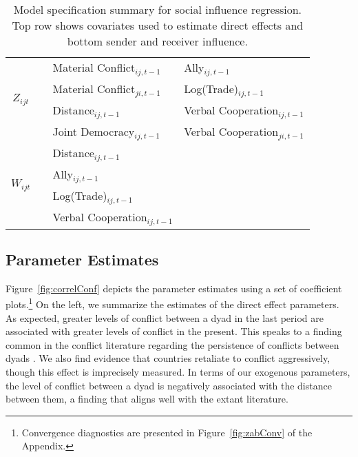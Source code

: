 \begin{table}[ht]
\centering
	\begin{tabular}{ccll}
		\hline\hline
		\multirow{4}{*}{\Large{$Z_{ijt}$}} &
		\multirow{4}{*}{\resizebox{.1\textwidth}{!}{}}
		&
		Material Conflict$_{ij,t-1}$ & Ally$_{ij,t-1}$ \\
		~ & ~ & Material Conflict$_{ji,t-1}$ & Log(Trade)$_{ij,t-1}$ \\
		~ & ~ & Distance$_{ij,t-1}$ & Verbal Cooperation$_{ij,t-1}$ \\
		~ & ~ & Joint Democracy$_{ij,t-1}$ & Verbal Cooperation$_{ji,t-1}$	\\
		\hline
		\multirow{4}{*}{\Large{$W_{ijt}$}} &
		\multirow{4}{*}{\resizebox{.1\textwidth}{!}{}} & Distance$_{ij,t-1}$ \\
		~ & ~ &  Ally$_{ij,t-1}$ \\
		~ & ~ & Log(Trade)$_{ij,t-1}$  \\
		~ & ~ & Verbal Cooperation$_{ij,t-1}$ \\
		\hline\hline
	\end{tabular}
	\caption{Model specification summary for social influence regression. Top row shows covariates used to estimate direct effects and bottom sender and receiver influence.}
	\label{tab:modspec}
\end{table}
\FloatBarrier

\subsection*{Parameter Estimates}

Figure~\ref{fig:correlConf} depicts the parameter estimates using a set of coefficient plots.\footnote{Convergence diagnostics are presented in Figure~\ref{fig:zabConv} of the Appendix.} On the left, we summarize the estimates of the direct effect parameters. As expected, greater levels of conflict between a dyad in the last period are associated with greater levels of conflict in the present. This speaks to a finding common in the conflict literature regarding the persistence of conflicts between dyads \citep{brandt:etal:2000}. We also find evidence that countries retaliate to conflict aggressively, though this effect is imprecisely measured. In terms of our exogenous parameters, the level of conflict between a dyad is negatively associated with the distance between them, a finding that aligns well with the extant literature.

